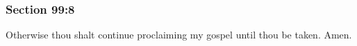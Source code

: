 	\subsubsection{Section 99:8} %
		\label{DC99-8}

		Otherwise thou shalt continue proclaiming my gospel until thou be taken.  Amen.

